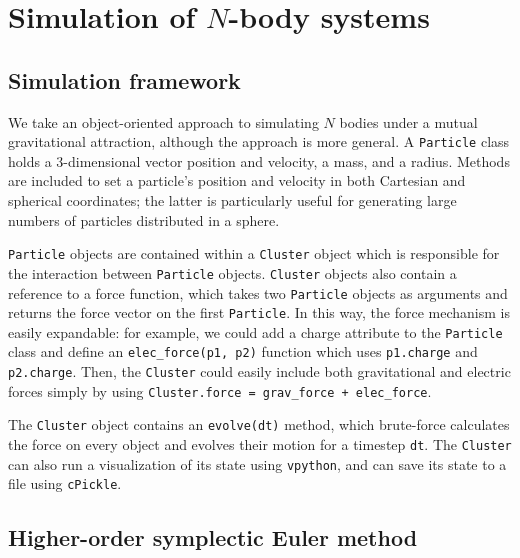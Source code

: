 \documentclass{article}
\begin{document}
\section{Simulation of $N$-body systems}

\subsection{Simulation framework}

We take an object-oriented approach to simulating $N$ bodies under a mutual
gravitational attraction, although the approach is more general. A
\texttt{Particle} class holds a 3-dimensional vector position and velocity,
a mass, and a radius. Methods are included to set a particle's position
and velocity in both Cartesian and spherical coordinates; the latter is
particularly useful for generating large numbers of particles distributed
in a sphere.

\texttt{Particle} objects are contained within a \texttt{Cluster} object
which is responsible for the interaction between \texttt{Particle} objects.
\texttt{Cluster} objects also contain a reference to a force function, which
takes two \texttt{Particle} objects as arguments and returns the force vector
on the first \texttt{Particle}. In this way, the force mechanism is easily
expandable: for example, we could add a charge attribute to the
\texttt{Particle} class and define an \texttt{elec_force(p1, p2)}
function which uses \texttt{p1.charge} and \texttt{p2.charge}. Then,
the \texttt{Cluster} could easily include both gravitational and electric
forces simply by using \texttt{Cluster.force = grav_force + elec_force}.

The \texttt{Cluster} object contains an \texttt{evolve(dt)} method, which
brute-force calculates the force on every object and evolves their motion
for a timestep \texttt{dt}. The \texttt{Cluster} can also run a visualization
of its state using \texttt{vpython}, and can save its state to a file
using \texttt{cPickle}.

\subsection{Higher-order symplectic Euler method}
\end{document}
